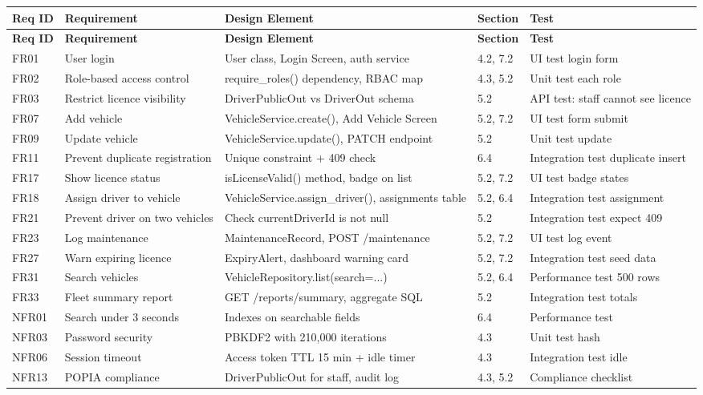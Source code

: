 \documentclass[11pt,a4paper]{article}
\begin{document}
\begin{longtable}{|p{1cm}|p{3.5cm}|p{5cm}|p{2cm}|p{2cm}|}
\hline
\textbf{Req ID} & \textbf{Requirement} & \textbf{Design Element} & \textbf{Section} & \textbf{Test} \\
\hline
\endfirsthead
\hline
\textbf{Req ID} & \textbf{Requirement} & \textbf{Design Element} & \textbf{Section} & \textbf{Test} \\
\hline
\endhead
FR01 & User login & User class, Login Screen, auth service & 4.2, 7.2 & UI test login form \\
\hline
FR02 & Role-based access control & require\_roles() dependency, RBAC map & 4.3, 5.2 & Unit test each role \\
\hline
FR03 & Restrict licence visibility & DriverPublicOut vs DriverOut schema & 5.2 & API test: staff cannot see licence \\
\hline
FR07 & Add vehicle & VehicleService.create(), Add Vehicle Screen & 5.2, 7.2 & UI test form submit \\
\hline
FR09 & Update vehicle & VehicleService.update(), PATCH endpoint & 5.2 & Unit test update \\
\hline
FR11 & Prevent duplicate registration & Unique constraint + 409 check & 6.4 & Integration test duplicate insert \\
\hline
FR17 & Show licence status & isLicenseValid() method, badge on list & 5.2, 7.2 & UI test badge states \\
\hline
FR18 & Assign driver to vehicle & VehicleService.assign\_driver(), assignments table & 5.2, 6.4 & Integration test assignment \\
\hline
FR21 & Prevent driver on two vehicles & Check currentDriverId is not null & 5.2 & Integration test expect 409 \\
\hline
FR23 & Log maintenance & MaintenanceRecord, POST /maintenance & 5.2, 7.2 & UI test log event \\
\hline
FR27 & Warn expiring licence & ExpiryAlert, dashboard warning card & 5.2, 7.2 & Integration test seed data \\
\hline
FR31 & Search vehicles & VehicleRepository.list(search=...) & 5.2, 6.4 & Performance test 500 rows \\
\hline
FR33 & Fleet summary report & GET /reports/summary, aggregate SQL & 5.2 & Integration test totals \\
\hline
NFR01 & Search under 3 seconds & Indexes on searchable fields & 6.4 & Performance test \\
\hline
NFR03 & Password security & PBKDF2 with 210,000 iterations & 4.3 & Unit test hash \\
\hline
NFR06 & Session timeout & Access token TTL 15 min + idle timer & 4.3 & Integration test idle \\
\hline
NFR13 & POPIA compliance & DriverPublicOut for staff, audit log & 4.3, 5.2 & Compliance checklist \\
\hline
\end{longtable}
\end{document}
